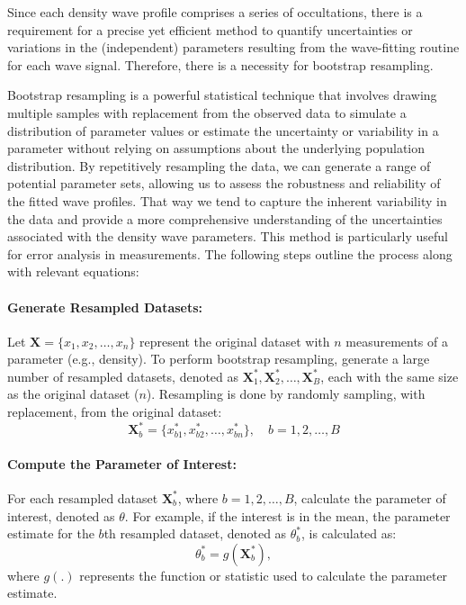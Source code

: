 \documentclass{article}
\begin{document}
Since each density wave profile comprises a series of occultations, there is a requirement for a precise yet efficient method to quantify uncertainties or variations in the (independent) parameters resulting from the wave-fitting routine for each wave signal. Therefore, there is a necessity for bootstrap resampling.

Bootstrap resampling is a powerful statistical technique that involves drawing multiple samples with replacement from the observed data to simulate a distribution of parameter values or estimate the uncertainty or variability in a parameter without relying on assumptions about the underlying population distribution\cite{Chernick2007BootstrapMA}\cite{davison_hinkley_1997}. By repetitively resampling the data, we can generate a range of potential parameter sets, allowing us to assess the robustness and reliability of the fitted wave profiles. That way we tend to capture the inherent variability in the data and provide a more comprehensive understanding of the uncertainties associated with the density wave parameters\cite{Efron1994AnIT}\cite{article}. This method is particularly useful for error analysis in measurements. The following steps outline the process along with relevant equations:

\paragraph{Generate Resampled Datasets:}
Let $\mathbf{X} = \{x_1, x_2, \ldots, x_n\}$ represent the original dataset with $n$ measurements of a parameter (e.g., density). To perform bootstrap resampling, generate a large number of resampled datasets, denoted as $\mathbf{X}^{*}_1, \mathbf{X}^{*}_2, \ldots, \mathbf{X}^{*}_B$, each with the same size as the original dataset ($n$). Resampling is done by randomly sampling, with replacement, from the original dataset\cite{Chernick2007BootstrapMA}\cite{davison_hinkley_1997}\cite{Efron1994AnIT}\cite{article}:
\begin{equation}
\mathbf{X}^{*}_b = \{x^{*}_{b1}, x^{*}_{b2}, \ldots, x^{*}_{bn}\}, \quad b = 1, 2, \ldots, B
\end{equation}

\paragraph{Compute the Parameter of Interest:}
For each resampled dataset $\mathbf{X}^{*}_b$, where $b = 1, 2, \ldots, B$, calculate the parameter of interest, denoted as $\theta$. For example, if the interest is in the mean, the parameter estimate for the $b$th resampled dataset, denoted as $\theta^{*}_{b}$, is calculated as\cite{Chernick2007BootstrapMA}\cite{davison_hinkley_1997}\cite{Efron1994AnIT}\cite{article}:
\begin{equation}
\theta^{*}_{b} = g(\mathbf{X}^{*}_b),
\end{equation}
where $g(.)$ represents the function or statistic used to calculate the parameter estimate.
\end{document}
